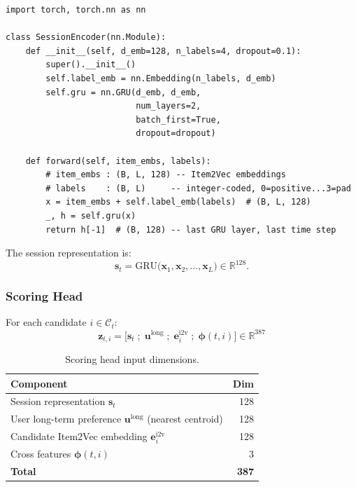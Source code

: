 \documentclass[11pt]{article}
\begin{document}
\begin{lstlisting}
import torch, torch.nn as nn

class SessionEncoder(nn.Module):
    def __init__(self, d_emb=128, n_labels=4, dropout=0.1):
        super().__init__()
        self.label_emb = nn.Embedding(n_labels, d_emb)
        self.gru = nn.GRU(d_emb, d_emb,
                          num_layers=2,
                          batch_first=True,
                          dropout=dropout)

    def forward(self, item_embs, labels):
        # item_embs : (B, L, 128) -- Item2Vec embeddings
        # labels    : (B, L)     -- integer-coded, 0=positive...3=pad
        x = item_embs + self.label_emb(labels)  # (B, L, 128)
        _, h = self.gru(x)
        return h[-1]  # (B, 128) -- last GRU layer, last time step
\end{lstlisting}

The session representation is:
\[
  \mathbf{s}_t
  = \text{GRU}\!\bigl(\mathbf{x}_1, \mathbf{x}_2, \ldots, \mathbf{x}_L\bigr)
  \in \mathbb{R}^{128}.
\]

\subsubsection{Scoring Head}

For each candidate $i \in \mathcal{C}_t$:
\[
  \mathbf{z}_{t,i}
  = \bigl[
      \mathbf{s}_t \;;\;
      \mathbf{u}^{\text{long}} \;;\;
      \mathbf{e}^{\text{i2v}}_i \;;\;
      \bm{\phi}(t, i)
    \bigr]
  \in \mathbb{R}^{387}
\]

\begin{table}[H]
\centering
\caption{Scoring head input dimensions.}
\begin{tabular}{lr}
\toprule
\textbf{Component} & \textbf{Dim} \\
\midrule
Session representation $\mathbf{s}_t$ & 128 \\
User long-term preference $\mathbf{u}^{\text{long}}$ (nearest centroid) & 128 \\
Candidate Item2Vec embedding $\mathbf{e}^{\text{i2v}}_i$ & 128 \\
Cross features $\bm{\phi}(t, i)$ & 3 \\
\midrule
\textbf{Total} & \textbf{387} \\
\bottomrule
\end{tabular}
\end{table}
\end{document}
